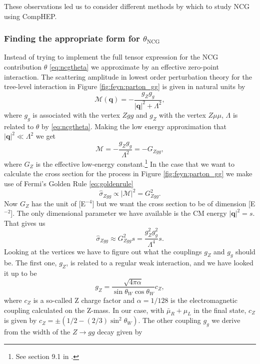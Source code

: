 These observations led us to consider different methods by which to study NCG using CompHEP.

\subsubsection{Finding the appropriate form for $\theta_\textrm{NCG}$}
Instead of trying to implement the full tensor expression for the NCG contribution $\theta$ \eqref{eq:ncgtheta} we approximate by an effective zero-point interaction. The scattering amplitude in lowest order perturbation theory for the tree-level interaction in Figure \ref{fig:feyn:parton_gg} is given in natural units by
\begin{equation}
	\mathcal{M}(\mathbf{q}) = -\frac{g_Z g_g }{|\mathbf{q}|^2 + \Lambda^2},
\end{equation}
where $g_g$ is associated with the vertex $Zgg$ and $g_Z$ with the vertex $Z\mu\mu$, $\Lambda$ is related to $\theta$ by \eqref{eq:ncgtheta}. Making the low energy approximation that $|\mathbf{q}|^2 \ll \Lambda^2$ we get
\begin{equation} \label{eq:scatteringamplitude}
	\mathcal{M} = -\frac{g_Z g_g}{\Lambda^2} = -G_{Zgg},
\end{equation}
where $G_Z$ is the effective low-energy constant.\footnote{See section 9.1 in \cite{martin1998pp}.} In the case that we want to calculate the cross section for the process in Figure \ref{fig:feyn:parton_gg} we make use of Fermi's Golden Rule \eqref{eq:goldenrule}
\begin{equation}
	\hat \sigma_{Zgg} \propto |\mathcal{M}|^2 = G_{Zgg}^2.
\end{equation}
Now $G_Z$ has the unit of [E$^{-4}$] but we want the cross section to be of dimension [E$^{-2}$]. The only dimensional parameter we have available is the CM energy $|\mathbf{q}|^2 = s$. That gives us
\begin{equation}
	\hat \sigma_{Zgg} \approx G_{Zgg}^2 s = \frac{g_Z^2 g_g^2}{\Lambda^4}s.
\end{equation}
Looking at the vertices we have to figure out what the couplings $g_Z$ and $g_g$ should be. The first one, $g_Z$, is related to a regular weak interaction, and we have looked it up to be \cite{bettini2008iep}
\begin{equation}
	g_Z = \frac{\sqrt{4\pi\alpha}}{\sin{\theta_W}\cos{\theta_W}} c_Z,
\end{equation}
where $c_Z$ is a so-called Z charge factor and $\alpha = 1/128$ is the electromagnetic coupling calculated on the Z-mass. In our case, with $\bar \mu_R + \mu_L$ in the final state, $c_Z$ is given by $c_Z = \pm (1/2 - (2/3)\sin^2{\theta_W})$. The other coupling $g_g$ we derive from the width of the $Z \rightarrow gg$ decay given by \cite{behr2003dnc}
